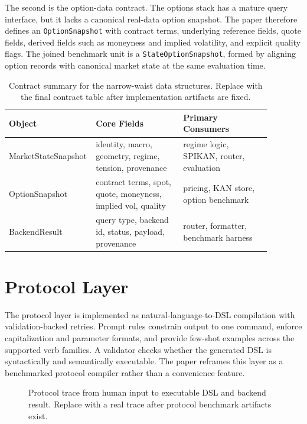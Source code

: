 \documentclass[11pt]{article}
\begin{document}
The second is the option-data contract. The options stack has a mature query
interface, but it lacks a canonical real-data option snapshot. The paper
therefore defines an \texttt{OptionSnapshot} with contract terms, underlying
reference fields, quote fields, derived fields such as moneyness and implied
volatility, and explicit quality flags. The joined benchmark unit is a
\texttt{StateOptionSnapshot}, formed by aligning option records with canonical
market state at the same evaluation time.

\begin{table}[H]
  \centering
  \caption{Contract summary for the narrow-waist data structures. Replace with
  the final contract table after implementation artifacts are fixed.}
  \label{tab:contracts}
  \begin{tabular}{p{0.22\linewidth} p{0.33\linewidth} p{0.33\linewidth}}
    \toprule
    Object & Core Fields & Primary Consumers \\
    \midrule
    MarketStateSnapshot & identity, macro, geometry, regime, tension, provenance & regime logic, SPIKAN, router, evaluation \\
    OptionSnapshot & contract terms, spot, quote, moneyness, implied vol, quality & pricing, KAN store, option benchmark \\
    BackendResult & query type, backend id, status, payload, provenance & router, formatter, benchmark harness \\
    \bottomrule
  \end{tabular}
\end{table}

\section{Protocol Layer}

The protocol layer is implemented as natural-language-to-DSL compilation with
validation-backed retries. Prompt rules constrain output to one command, enforce
capitalization and parameter formats, and provide few-shot examples across the
supported verb families. A validator checks whether the generated DSL is
syntactically and semantically executable. The paper reframes this layer as a
benchmarked protocol compiler rather than a convenience feature.

\begin{figure}[H]
  \centering
  \caption{Protocol trace from human input to executable DSL and backend result.
  Replace with a real trace after protocol benchmark artifacts exist.}
  \label{fig:protocol-trace}
\end{figure}
\end{document}

